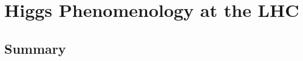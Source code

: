 \chapter{Higgs Phenomenology at the LHC}
\label{sec:pheno}

\section{Summary}
\label{sec:pheno_summary}